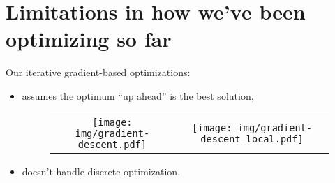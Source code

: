 \section{Limitations in how we've been optimizing so far}

\begin{frame}

Our iterative gradient-based optimizations:
\begin{itemize}
\item assumes the optimum ``up ahead'' is the best solution,

\begin{figure}[ht]
  \centering
  \begin{tabular}{c c}
      \texttt{[image: img/gradient-descent.pdf]} &
      \texttt{[image: img/gradient-descent\_local.pdf]}
  \end{tabular}
\end{figure}

\item doesn't handle discrete optimization.
\end{itemize}

\end{frame}
